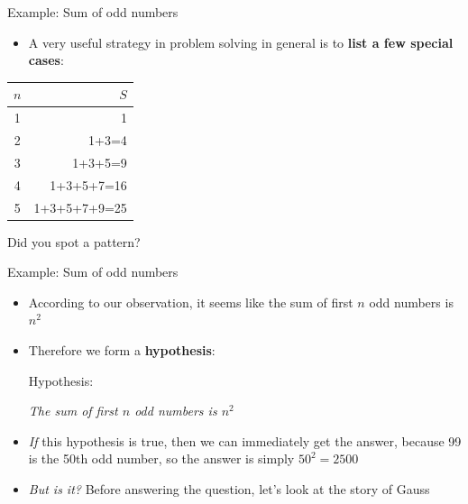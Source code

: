 \documentclass[10pt,xcolor={table,dvipsnames},t]{beamer}
\begin{document}
\begin{frame}{Example: Sum of odd numbers}
  \begin{itemize}
    \item A very useful strategy in problem solving in general is to \textbf{list a few special cases}:
  \end{itemize}
  \begin{table}
    \centering
    \begin{tabular}{|c|r|}
      \hline $n$ & $S$\\\hline
      1 & 1\\
      2 & 1+3=4\\
      3 & 1+3+5=9\\
      4 & 1+3+5+7=16\\
      5 & 1+3+5+7+9=25\\\hline
    \end{tabular}
  \end{table}
  Did you spot a pattern?
\end{frame}

\begin{frame}{Example: Sum of odd numbers}
  \begin{itemize}
    \item According to our observation, it seems like the sum of first $n$ odd numbers is $n^2$
    \item Therefore we form a \textbf{hypothesis}:
    \begin{exampleblock}{Hypothesis:}
      \begin{center}
        \textit{The sum of first $n$ odd numbers is $n^2$}
      \end{center}
    \end{exampleblock}
    \item \textit{If} this hypothesis is true, then we can immediately get the answer, because 99 is the 50th odd number, so the answer is simply $50^2 = 2500$
    \item \textit{But is it?} Before answering the question, let's look at the story of Gauss
  \end{itemize}
\end{frame}
\end{document}
